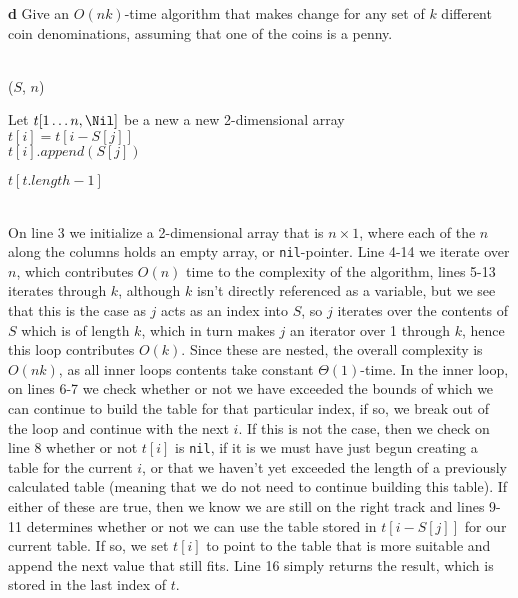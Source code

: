 \documentclass[11pt,english]{article}
\begin{document}
\newpage
\noindent \large{\textbf{d} Give an $O(nk)$-time algorithm that makes change for any set of $k$
different coin denominations, assuming that one of the coins is a penny.}
\\\\
\begin{algorithm}
	
	\BlankLine
	
	\Coin($S$, $n$) \\
	\Begin
	{	
	Let $t[1 \dots n, \Nil]$ be a new a new 2-dimensional array\\
	
	{
		{
			 {\Continue}
			{
				{
					$t[i] = t[i - S[j]]$\\
					$t[i].append(S[j])$
				}
			}
		}
	}	
	
	\Return $t[t.length-1]$
	}
\end{algorithm}
\\
On line 3 we initialize a 2-dimensional array that is $n \times 1$, where each
of the $n$ along the columns holds an empty array, or \texttt{nil}-pointer.
Line 4-14 we iterate over $n$, which contributes $O(n)$ time to the complexity
of the algorithm, lines 5-13 iterates through $k$, although $k$ isn't directly
referenced as a variable, but we see that this is the case as $j$ acts as an
index into $S$, so $j$ iterates over the contents of $S$ which is of length
$k$, which in turn makes $j$ an iterator over 1 through $k$, hence this loop
contributes $O(k)$. Since these are nested, the overall complexity is $O(nk)$,
as all inner loops contents take constant $\Theta(1)$-time. In the inner loop,
on lines 6-7 we check whether or not we have exceeded the bounds of which we
can continue to build the table for that particular index, if so, we break out
of the loop and continue with the next $i$. If this is not the case, then we
check on line 8 whether or not $t[i]$ is \texttt{nil}, if it is we must have
just begun creating a table for the current $i$, or that we haven't yet
exceeded the length of a previously calculated table (meaning that we do not
need to continue building this table). If either of these are true, then we
know we are still on the right track and lines 9-11 determines whether or not
we can use the table stored in $t[i - S[j]]$ for our current table. If so, we
set $t[i]$ to point to the table that is more suitable and append the next
value that still fits. Line 16 simply returns the result, which is stored in
the last index of $t$.







\end{document}
